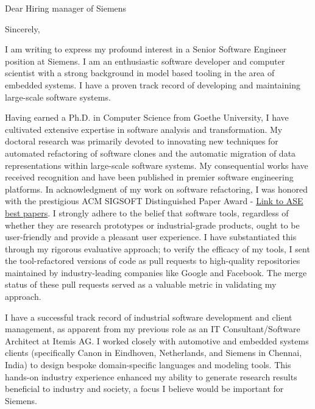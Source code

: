 \documentclass[12pt,a4paper,sans]{moderncv}
\begin{document}
\date{\today}
\opening{Dear Hiring manager of Siemens}
\closing{Sincerely,}

\makelettertitle

I am writing to express my profound interest in a Senior Software Engineer position at Siemens. I am an enthusiastic software developer and computer scientist with a strong background in model based tooling in the area of embedded systems. I have a proven track record of developing and maintaining large-scale software systems. 

Having earned a Ph.D. in Computer Science from Goethe University, I have cultivated extensive expertise in software analysis and transformation. My doctoral research was primarily devoted to innovating new techniques for automated refactoring of software clones and the automatic migration of data representations within large-scale software systems. My consequential works have received recognition and have been published in premier software engineering platforms. In acknowledgment of my work on software refactoring, I was honored with the prestigious ACM SIGSOFT Distinguished Paper Award - \href{https://ase-conferences.org/olbib/}{Link to ASE best papers}. I strongly adhere to the belief that software tools, regardless of whether they are research prototypes or industrial-grade products, ought to be user-friendly and provide a pleasant user experience. I have substantiated this through my rigorous evaluative approach; to verify the efficacy of my tools, I sent the tool-refactored versions of code as pull requests to high-quality repositories maintained by industry-leading companies like Google and Facebook. The merge status of these pull requests served as a valuable metric in validating my approach.

I have a successful track record of industrial software development and client management, as apparent from my previous role as an IT Consultant/Software Architect at Itemis AG. I worked closely with automotive and embedded systems clients (specifically Canon in Eindhoven, Netherlands, and Siemens in Chennai, India) to design bespoke domain-specific languages and modeling tools. This hands-on industry experience enhanced my ability to generate research results beneficial to industry and society, a focus I believe would be important for Siemens.
\end{document}
